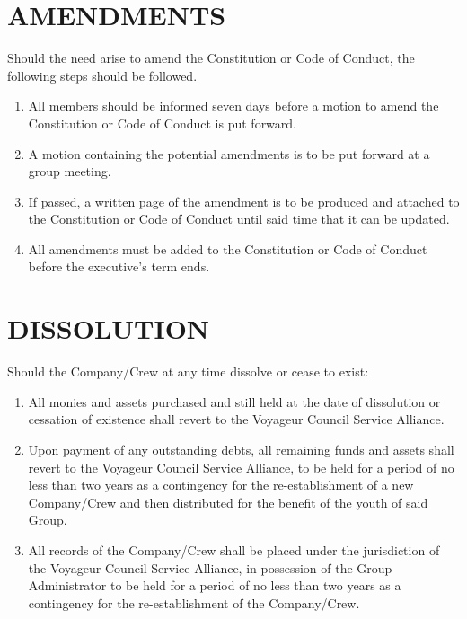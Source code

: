 \documentclass{Service_Corps_Document}
\begin{document}
    \section{AMENDMENTS}\label{sec:amendments}
    Should the need arise to amend the Constitution or Code of Conduct, the following steps should be followed.
    \begin{enumerate}
        \item All members should be informed seven days before a motion to amend the Constitution or Code of Conduct is put forward.
        \item A motion containing the potential amendments is to be put forward at a group meeting.
        \item If passed, a written page of the amendment is to be produced and attached to the Constitution or Code of Conduct until said time that it can be updated.
        \item All amendments must be added to the Constitution or Code of Conduct before the executive's term ends.
    \end{enumerate}


    \section{DISSOLUTION}\label{sec:dissolution}
    Should the Company/Crew at any time dissolve or cease to exist:
    \begin{enumerate}
        \item All monies and assets purchased and still held at the date of dissolution or cessation of existence shall revert to the Voyageur Council Service Alliance.
        \item Upon payment of any outstanding debts, all remaining funds and assets shall revert to the Voyageur Council Service Alliance, to be held for a period of no less than two years as a contingency for the re-establishment of a new Company/Crew and then distributed for the benefit of the youth of said Group.
        \item All records of the Company/Crew shall be placed under the jurisdiction of the Voyageur Council Service Alliance, in possession of the Group Administrator to be held for a period of no less than two years as a contingency for the re-establishment of the Company/Crew.
    \end{enumerate}
\end{document}
